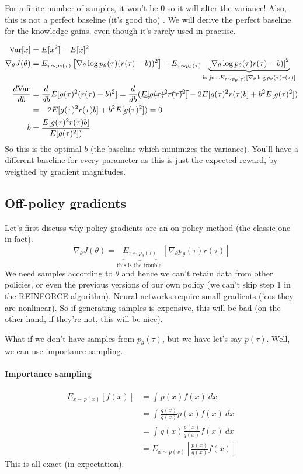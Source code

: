 \documentclass{report}
\begin{document}
For a finite number of samples, it won't be 0 so it will alter the variance!
Also, this is not a perfect baseline (it's good tho) . 
We will derive the perfect baseline for the knowledge gains, even though it's rarely used in practise.

\begin{align}
		\text{Var} [x] &= E[x^2] - E[x]^2 \\
		\nabla_\theta J(\theta) &= E_{\tau \sim p_\theta(\tau)} 
		\left [ \nabla_\theta \log p_\theta(\tau) (r(\tau) - b))^2 \right ]
		- E_{\tau \sim p_\theta(\tau)} 
		\underbrace{\left [ \nabla_\theta \log p_\theta(\tau) r(\tau) - b) \right ]^2}_
		{\text{is just} E_{\tau \sim p_\theta(\tau)} \left [ \nabla_\theta \log p_\theta(\tau) r(\tau) \right ]}  \\
		\frac{d \text{Var}}{db} &= \frac{d}{db} E[g(\tau)^2(r(\tau) - b)^2]
		= \frac{d}{db} (\cancel{E[g(\tau)^2r(\tau)^2]} - 2E[g(\tau)^2r(\tau)b ] + b^2 E[g(\tau)^2]) \\
								&= -2E[g(\tau)^2r(\tau)b ] + b^2 E[g(\tau)^2]) = 0\\
b &= \frac{E[g(\tau)^2r(\tau)b ]}{E[g(\tau)^2])} 
\end{align}
So this is the optimal $b$ (the baseline which minimizes the variance).
You'll have a different baseline for every parameter as
this is just the expected reward, by weigthed by gradient magnitudes.

\subsection{Off-policy gradients}
Let's first discuss why policy gradients are an on-policy method (the classic one in fact).
\begin{equation}
		\nabla_\theta J(\theta) = \underbrace{E_{\tau \sim p_\theta(\tau)}}_{\text{this is the trouble!}} [\nabla_\theta p_\theta(\tau)r(\tau)]
\end{equation}
We need samples according to $\theta$ and hence we can't retain data from other policies, or even 
the previous versions of our own policy (we can't skip step 1 in the REINFORCE algorithm).
Neural networks require small gradients ('cos they are nonlinear).
So if generating samples is expensive, this will be bad (on the other hand,
if they're not, this will be nice).

What if we don't have samples from $p_\theta(\tau)$, but we have let's say
$\bar{p}(\tau)$.
Well, we can use importance sampling.
\paragraph{Importance sampling}
\begin{align}
		E_{x \sim p(x)} [f(x)]  
		&= \int_{{}}^{{}} {p(x)f(x)} \: d{x} \\
		&= \int_{{}}^{{}} {\frac{q(x)}{q(x)}  p(x)f(x)} \: d{x} \\
		&= \int_{{}}^{{}} { q(x) \frac{p(x)}{q(x)}  f(x)} \: d{x} \\
		&= E_{x \sim p(x)} \left [ \frac{p(x)}{q(x)} f(x) \right ]
\end{align}
This is all exact (in expectation).
\end{document}
